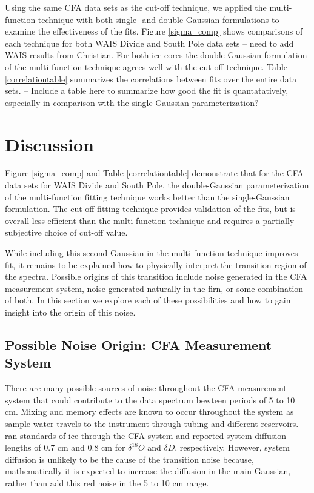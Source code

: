 \documentclass[draft, jgrga]{AGUTeX}
\begin{document}
\begin{article}
Using the same CFA data sets as the cut-off technique, we applied the multi-function technique with both single- and double-Gaussian formulations to examine the effectiveness of the fits. Figure \ref{sigma_comp} shows comparisons of each technique for both WAIS Divide and South Pole data sets -- need to add WAIS results from Christian. For both ice cores the double-Gaussian formulation of the multi-function technique agrees well with the cut-off technique. Table \ref{correlationtable} summarizes the correlations between fits over the entire data sets. -- Include a table here to summarize how good the fit is quantatatively, especially in comparison with the single-Gaussian parameterization?




\section{Discussion}

Figure \ref{sigma_comp} and Table \ref{correlationtable} demonstrate that for the CFA data sets for WAIS Divide and South Pole, the double-Gaussian parameterization of the multi-function fitting technique works better than the single-Gaussian formulation. The cut-off fitting technique provides validation of the fits, but is overall less efficient than the multi-function technique and requires a partially subjective choice of cut-off value.

While including this second Gaussian in the multi-function technique improves fit, it remains to be explained how to physically interpret the transition region of the spectra. Possible origins of this transition include noise generated in the CFA measurement system, noise generated naturally in the firn, or some combination of both. In this section we explore each of these possibilities and how to gain insight into the origin of this noise.

\subsection{Possible Noise Origin: CFA Measurement System}

There are many possible sources of noise throughout the CFA measurement system that could contribute to the data spectrum bewteen periods of 5 to 10 cm. Mixing and memory effects are known to occur throughout the system as sample water travels to the instrument through tubing and different reservoirs. \citet{JonesCFA2016} ran standards of ice through the CFA system and reported system diffusion lengths of 0.7 cm and 0.8 cm for $\delta ^{18}O$ and $\delta D$, respectively. However, system diffusion is unlikely to be the cause of the transition noise because, mathematically it is expected to increase the diffusion in the main Gaussian, rather than add this red noise in the 5 to 10 cm range.


\end{article}
\end{document}
